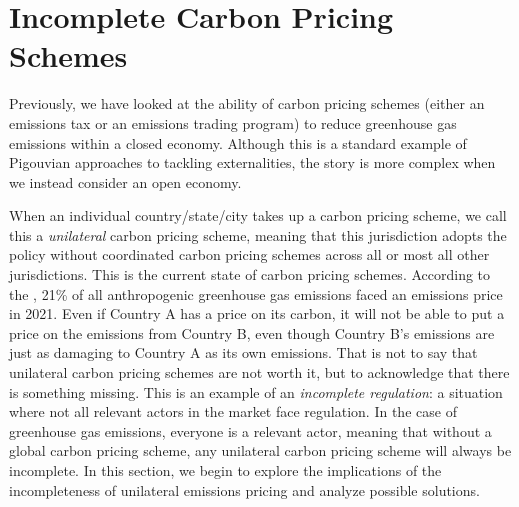 \newpage
\section{Incomplete Carbon Pricing Schemes}


Previously, we have looked at the ability of carbon pricing schemes (either an emissions tax or an emissions trading program) to reduce greenhouse gas emissions within a closed economy. Although this is a standard example of Pigouvian approaches to tackling externalities, the story is more complex when we instead consider an open economy. 

When an individual country/state/city takes up a carbon pricing scheme, we call this a \emph{unilateral} carbon pricing scheme, meaning that this jurisdiction adopts the policy without coordinated carbon pricing schemes across all or most all other jurisdictions. This is the current state of carbon pricing schemes. According to the \cite{wbank}, 21\% of all anthropogenic greenhouse gas emissions faced an emissions price in 2021. Even if Country A has a price on its carbon, it will not be able to put a price on the emissions from Country B, even though Country B's emissions are just as damaging to Country A as its own emissions. That is not to say that unilateral carbon pricing schemes are not worth it, but to acknowledge that there is something missing. This is an example of an \emph{incomplete regulation}: a situation where not all relevant actors in the market face regulation. In the case of greenhouse gas emissions, everyone is a relevant actor, meaning that without a global carbon pricing scheme, any unilateral carbon pricing scheme will always be incomplete. In this section, we begin to explore the implications of the incompleteness of unilateral emissions pricing and analyze possible solutions.


